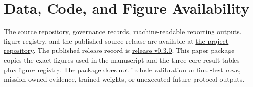 \section{Data, Code, and Figure Availability}

The source repository, governance records, machine-readable reporting outputs,
figure registry, and the published source release are available at
\href{https://github.com/taechasith/QMLforArtemisIV}{the project repository}.
The published release record is
\href{https://github.com/taechasith/QMLforArtemisIV/releases/tag/v0.3.0}{release v0.3.0}.
This paper package copies the exact figures used in the manuscript and the
three core result tables plus figure registry. The package does not include
calibration or final-test rows, mission-owned evidence, trained weights, or
unexecuted future-protocol outputs.
